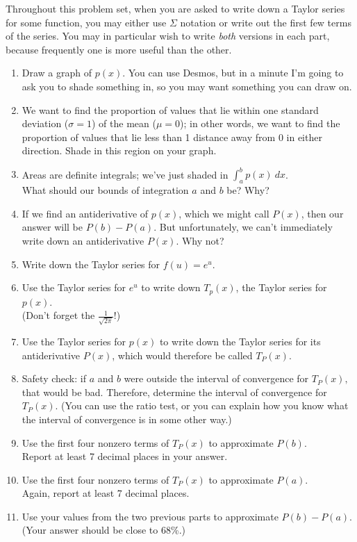 Throughout this problem set, when you are asked to write down a Taylor series for some function, you may either use $\Sigma$ notation or write out the first few terms of the series. You may in particular wish to write \textit{both} versions in each part, because frequently one is more useful than the other.
\begin{enumerate}[leftmargin=0pt]
    \item Draw a graph of $p(x)$. You can use Desmos, but in a minute I'm going to ask you to shade something in, so you may want something you can draw on.
    \item We want to find the proportion of values that lie within one standard deviation ($\sigma = 1$) of the mean ($\mu=0$); in other words, we want to find the proportion of values that lie less than 1 distance away from 0 in either direction. Shade in this region on your graph.
    \item Areas are definite integrals; we've just shaded in $\int_a^b p(x)\ dx$.\\ What should our bounds of integration $a$ and $b$ be? Why?
    \item If we find an antiderivative of $p(x)$, which we might call $P(x)$, then our answer will be $P(b) - P(a)$. But unfortunately, we can't immediately write down an antiderivative $P(x)$. Why not?
    \item Write down the Taylor series for $f(u) = e^u$.
    \item Use the Taylor series for $e^u$ to write down $T_p(x)$, the Taylor series for $p(x).$  \\
    (Don't forget the $\tfrac{1}{\sqrt{2\pi}}$!)
    \item Use the Taylor series for $p(x)$ to write down the Taylor series for its antiderivative $P(x)$, which would therefore be called $T_P(x)$.
    \item Safety check: if $a$ and $b$ were outside the interval of convergence for $T_P(x),$ that would be bad. Therefore, determine the interval of convergence for $T_P(x)$. (You can use the ratio test, or you can explain how you know what the interval of convergence is in some other way.)
    \item Use the first four nonzero terms of $T_P(x)$ to approximate $P(b)$.\\ Report at least 7 decimal places in your answer.
    \item Use the first four nonzero terms of $T_P(x)$ to approximate $P(a)$.\\ Again, report at least 7 decimal places.
    \item Use your values from the two previous parts to approximate $P(b) - P(a)$. \\
    (Your answer should be close to 68\%.)


\end{enumerate}
